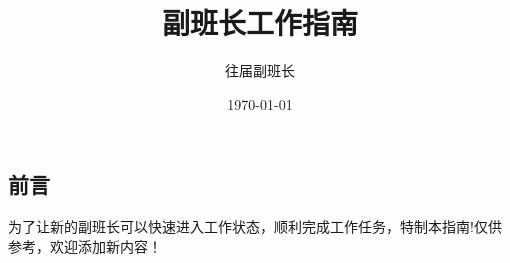 \documentclass{article} %
\begin{document}
\title{副班长工作指南}
\author{往届副班长}
\date{\today} %

\maketitle %

\subsection{前言}
为了让新的副班长可以快速进入工作状态，顺利完成工作任务，特制本指南!仅供参考，欢迎添加新内容！
\end{document}

